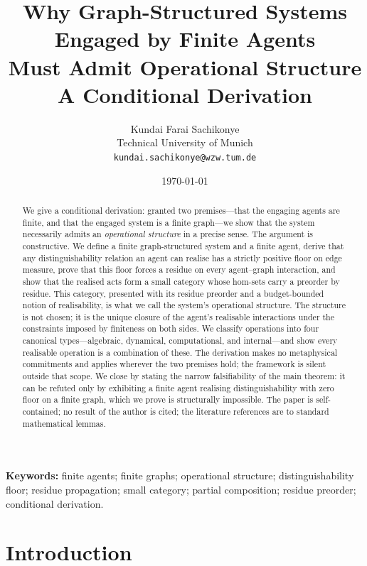 \documentclass[11pt,a4paper]{article}
\title{\textbf{Why Graph-Structured Systems Engaged by Finite Agents\\
Must Admit Operational Structure}\\[4pt]
\large A Conditional Derivation}
\author{%
Kundai Farai Sachikonye\\
\small Technical University of Munich\\
\small \texttt{kundai.sachikonye@wzw.tum.de}}
\date{\today}
\theoremstyle{thmstyle}
\theoremstyle{definition}
\theoremstyle{remark}
\begin{document}
\maketitle

\begin{abstract}
\noindent
We give a conditional derivation: granted two premises---that the
engaging agents are finite, and that the engaged system is a finite
graph---we show that the system necessarily admits an
\emph{operational structure} in a precise sense. The argument is
constructive. We define a finite graph-structured system and a finite
agent, derive that any distinguishability relation an agent can
realise has a strictly positive floor on edge measure, prove that
this floor forces a residue on every agent--graph interaction, and
show that the realised acts form a small category whose hom-sets
carry a preorder by residue. This category, presented with its
residue preorder and a budget-bounded notion of realisability, is
what we call the system's operational structure. The structure is
not chosen; it is the unique closure of the agent's realisable
interactions under the constraints imposed by finiteness on both
sides. We classify operations into four canonical types---algebraic,
dynamical, computational, and internal---and show every realisable
operation is a combination of these. The derivation makes no
metaphysical commitments and applies wherever the two premises
hold; the framework is silent outside that scope. We close by
stating the narrow falsifiability of the main theorem: it can be
refuted only by exhibiting a finite agent realising
distinguishability with zero floor on a finite graph, which we prove
is structurally impossible. The paper is self-contained; no result
of the author is cited; the literature references are to standard
mathematical lemmas.
\end{abstract}

\medskip
\noindent\textbf{Keywords:} finite agents; finite graphs; operational
structure; distinguishability floor; residue propagation; small
category; partial composition; residue preorder; conditional
derivation.

\tableofcontents

\section{Introduction}
\label{sec:intro}
\end{document}
